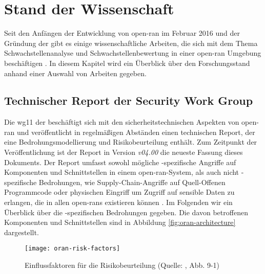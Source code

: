 \chapter{Stand der Wissenschaft}
\label{chap:forschungsstand}
Seit den Anfängen der Entwicklung von \gls{open-ran} im Februar 2016 und der Gründung der  gibt es einige wissenschaftliche Arbeiten, die sich mit dem Thema Schwachstellenanalyse und Schwachstellenbewertung in einer \gls{open-ran} Umgebung beschäftigen \autocite{ORANAlliance} \autocite{GuideOpenRAN}. In diesem Kapitel wird ein Überblick über den Forschungsstand anhand einer Auswahl von Arbeiten gegeben.
%
\section{Technischer Report der \orana Security Work Group}
\label{sec:forschungsstand-wg11}
Die \gls{wg11} der \orana beschäftigt sich mit den sicherheitstechnischen Aspekten von \gls{open-ran} und veröffentlicht in regelmäßigen Abständen einen technischen Report, der eine Bedrohungsmodellierung und Risikobeurteilung enthält. Zum Zeitpunkt der Veröffentlichung ist der Report in Version \textit{\textsf{v04.00}} die neueste Fassung dieses Dokuments. Der Report umfasst sowohl mögliche \oran-spezifische Angriffe auf Komponenten und Schnittstellen in einem \gls{open-ran}-System, als auch nicht \oran-spezifische Bedrohungen, wie Supply-Chain-Angriffe auf Quell-Offenen Programmcode oder physischen Eingriff um Zugriff auf sensible Daten zu erlangen, die in allen \glspl{open-ran} existieren können \autocite{o-ranworkgroup11securityworkgroupORANSecurityThreat2024}. Im Folgenden wir ein Überblick über die \oran-spezifischen Bedrohungen gegeben. Die davon betroffenen Komponenten und Schnittstellen sind in Abbildung \ref{fig:oran-architecture} dargestellt.
\begin{figure}
    \centering
    \texttt{[image: oran-risk-factors]}
    \caption{Einflussfaktoren für die Risikobeurteilung (Quelle: \autocite{o-ranworkgroup11securityworkgroupORANSecurityThreat2024}, Abb. 9-1)}
    \label{fig:oran-risk-factors}
\end{figure}
